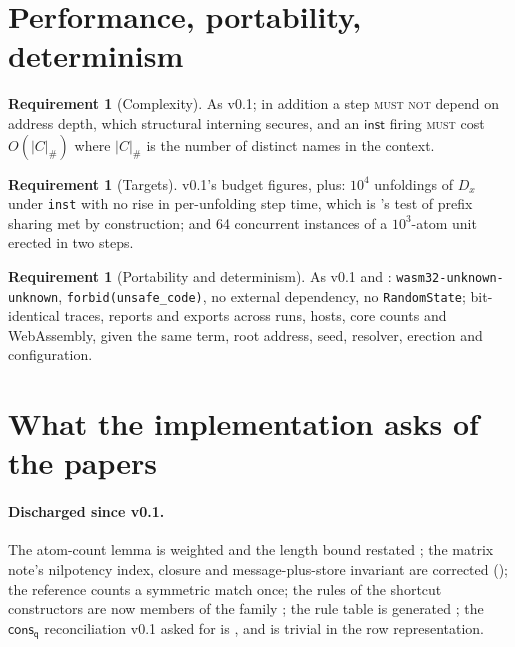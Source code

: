 \documentclass[11pt,a4paper]{article}
\newcommand{\code}[1]{\texttt{#1}}
\newcommand{\MUST}{\textsc{must}}
\newcommand{\MUSTNOT}{\textsc{must not}}
\newcommand{\qq}{\mathsf{q}}
\newcommand{\cons}{\mathsf{cons}}
\theoremstyle{definition}
\newtheorem{requirement}[definition]{Requirement}
\theoremstyle{plain}
\newcommand{\inst}{\mathsf{inst}}
\begin{document}
\section{Performance, portability, determinism}\label{sec:perf}

\begin{requirement}[Complexity]\label{req:complexity}
As v0.1; in addition a step \MUSTNOT{} depend on address depth, which
structural interning secures, and an $\inst$ firing \MUST{} cost $O(|C|_{\#})$
where $|C|_{\#}$ is the number of distinct names in the context.
\end{requirement}

\begin{requirement}[Targets]\label{req:targets}
v0.1's budget figures, plus: $10^{4}$ unfoldings of $D_{x}$ under \code{inst}
with no rise in per-unfolding step time, which is \cite[Req.~13.2]{combspec}'s
test of prefix sharing met by construction; and 64 concurrent instances of a
$10^{3}$-atom unit erected in two steps.
\end{requirement}

\begin{requirement}[Portability and determinism]\label{req:port}
As v0.1 and \cite[Req.~13.3]{combspec}: \code{wasm32-unknown-unknown},
\code{forbid(unsafe\_code)}, no external dependency, no \code{RandomState};
bit-identical traces, reports and exports across runs, hosts, core counts and
WebAssembly, given the same term, root address, seed, resolver, erection and
configuration.
\end{requirement}

\section{What the implementation asks of the papers}\label{sec:paper}

\paragraph{Discharged since v0.1.} The atom-count lemma is weighted and the
length bound restated \cite[Lem.~9.2, Prop.~9.9]{draft3}; the matrix note's
nilpotency index, closure and message-plus-store invariant are corrected
(\cite[Thm.~6.1, Cor.~6.2]{matnote}); the reference counts a symmetric match
once; the rules of the shortcut constructors are now members of the family
\cite[Def.~3.8]{draft3}; the rule table is generated
\cite[Req.~4.5]{combspec}; the $\cons_{\qq}$ reconciliation v0.1 asked for is
\cite[Rem.~3.9]{draft3}, and is trivial in the row representation.
\end{document}

